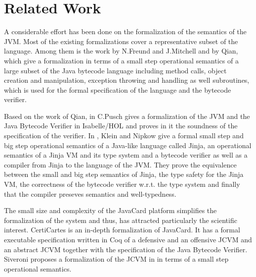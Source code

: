 \section{Related Work}\label{relWork}
 A considerable effort has been done on the formalization of 
 the semantics of the JVM. Most of the existing formalizations cover a representative subset 
 of the language. Among them is the work \cite{FM99FFJ} by N.Freund and J.Mitchell and \cite{qian99formal} by Qian,
 which give a formalization in terms of a small step operational semantics of a
 large subset of the Java bytecode language including method calls, object creation and manipulation,
 exception throwing and handling as well subroutines, which is used for the formal specification of the language and the bytecode verifier.

 Based on the work of Qian, in \cite{pusch98proving} C.Pusch gives a formalization of the JVM and the Java Bytecode Verifier
 in Isabelle/HOL and proves in it the soundness of the specification of the verifier.
 In \cite{KleinN04}, Klein and Nipkow give a formal small step and big step operational
 semantics of a Java-like language called Jinja, an operational semantics of a Jinja VM and its type system and a bytecode verifier as well as 
 a compiler from Jinja to the language of the JVM. They prove the equivalence between the small and big step
 semantics of Jinja, the  type safety for the Jinja VM, the correctness of the bytecode verifier w.r.t. the type system
 and finally that the compiler preseves semantics and well-typedness.
 
 The small size and complexity of the JavaCard platform simplifies the formalization of the system and thus,
 has attracted  particularly the scientific interest. CertiCartes \cite{barthe01formal,barthe02formal}
 is an in-depth formalization of JavaCard. It has a formal executable
 specification written in Coq of a defensive and an offensive JCVM and an abstract JCVM together with the specification
 of the Java Bytecode Verifier.  Siveroni proposes a formalization of the JCVM in \cite{siveroni04operational} in terms of
 a small step operational semantics. 


